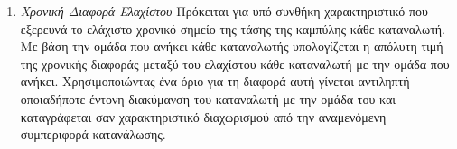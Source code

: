 \begin{enumerate}
\begin{center}
\end{center}
\item{\textit{Χρονική Διαφορά Ελαχίστου}} Πρόκειται για υπό συνθήκη χαρακτηριστικό που εξερευνά το ελάχιστο χρονικό σημείο της τάσης της καμπύλης κάθε καταναλωτή. Με βάση την ομάδα που ανήκει κάθε καταναλωτής υπολογίζεται η απόλυτη τιμή της χρονικής διαφοράς μεταξύ του ελαχίστου κάθε καταναλωτή με την ομάδα που ανήκει. Χρησιμοποιώντας ένα όριο για τη διαφορά αυτή γίνεται αντιληπτή οποιαδήποτε έντονη διακύμανση του καταναλωτή με την ομάδα του και καταγράφεται σαν χαρακτηριστικό διαχωρισμού από την αναμενόμενη συμπεριφορά κατανάλωσης.
\begin{center}
\end{center}
\end{enumerate}

